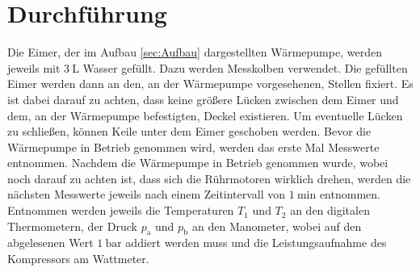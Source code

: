 
\section{Durchführung}
\label{sec:Durchführung}

Die Eimer, der im Aufbau \ref{sec:Aufbau} dargestellten Wärmepumpe, werden jeweils mit $\SI{3}{\liter}$ Wasser gefüllt. Dazu werden Messkolben verwendet. Die gefüllten Eimer werden dann an den, an der Wärmepumpe vorgesehenen, Stellen fixiert. Es ist dabei darauf zu achten, dass keine größere Lücken zwischen dem Eimer und dem, an der Wärmepumpe befestigten, Deckel existieren. Um eventuelle Lücken zu schließen, können Keile unter dem Eimer geschoben werden. Bevor die Wärmepumpe in Betrieb genommen wird, werden das erste Mal Messwerte entnommen. Nachdem die Wärmepumpe in Betrieb genommen wurde, wobei noch darauf zu achten ist, dass sich die Rührmotoren wirklich drehen, werden die nächsten Messwerte jeweils nach einem Zeitintervall von $\SI{1}{\minute}$ entnommen. Entnommen werden jeweils die Temperaturen $T_1$ und $T_2$ an den digitalen Thermometern, der Druck $p_\text{a}$ und $p_\text{b}$ an den Manometer, wobei auf den abgelesenen Wert $\SI{1}{\bar}$ addiert werden muss und die Leistungsaufnahme des Kompressors am Wattmeter.